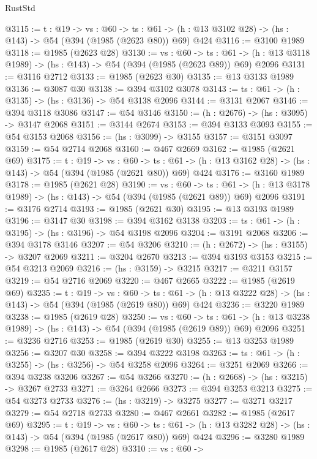\begin{lexlean}{RustStd}
\begin{coremodule}
@3115 := {t : @19} ->
  {vs : @60} ->
  {ts : @61} -> (h : @13 @3102 @28) -> (hs : @143) -> @54 (@394 (@1985 (@2623 @80)) @69) @424
@3116 := @3100 @1989
@3118 := @1985 (@2623 @28)
@3130 := {vs : @60} ->
  {ts : @61} -> (h : @13 @3118 @1989) -> (hs : @143) -> @54 (@394 (@1985 (@2623 @89)) @69) @2096
@3131 := @3116 @2712
@3133 := @1985 (@2623 @30)
@3135 := @13 @3133 @1989
@3136 := @3087 @30
@3138 := @394 @3102 @3078
@3143 := {ts : @61} -> (h : @3135) -> (hs : @3136) -> @54 @3138 @2096
@3144 := @3131 @2067
@3146 := @394 @3118 @3086
@3147 := @54 @3146
@3150 := (h : @2676) -> (hs : @3095) -> @3147 @2068
@3151 := @3144 @2674
@3153 := @394 @3133 @3093
@3155 := @54 @3153 @2068
@3156 := (hs : @3099) -> @3155
@3157 := @3151 @3097
@3159 := @54 @2714 @2068
@3160 := @467 @2669
@3162 := @1985 (@2621 @69)
@3175 := {t : @19} ->
  {vs : @60} ->
  {ts : @61} -> (h : @13 @3162 @28) -> (hs : @143) -> @54 (@394 (@1985 (@2621 @80)) @69) @424
@3176 := @3160 @1989
@3178 := @1985 (@2621 @28)
@3190 := {vs : @60} ->
  {ts : @61} -> (h : @13 @3178 @1989) -> (hs : @143) -> @54 (@394 (@1985 (@2621 @89)) @69) @2096
@3191 := @3176 @2714
@3193 := @1985 (@2621 @30)
@3195 := @13 @3193 @1989
@3196 := @3147 @30
@3198 := @394 @3162 @3138
@3203 := {ts : @61} -> (h : @3195) -> (hs : @3196) -> @54 @3198 @2096
@3204 := @3191 @2068
@3206 := @394 @3178 @3146
@3207 := @54 @3206
@3210 := (h : @2672) -> (hs : @3155) -> @3207 @2069
@3211 := @3204 @2670
@3213 := @394 @3193 @3153
@3215 := @54 @3213 @2069
@3216 := (hs : @3159) -> @3215
@3217 := @3211 @3157
@3219 := @54 @2716 @2069
@3220 := @467 @2665
@3222 := @1985 (@2619 @69)
@3235 := {t : @19} ->
  {vs : @60} ->
  {ts : @61} -> (h : @13 @3222 @28) -> (hs : @143) -> @54 (@394 (@1985 (@2619 @80)) @69) @424
@3236 := @3220 @1989
@3238 := @1985 (@2619 @28)
@3250 := {vs : @60} ->
  {ts : @61} -> (h : @13 @3238 @1989) -> (hs : @143) -> @54 (@394 (@1985 (@2619 @89)) @69) @2096
@3251 := @3236 @2716
@3253 := @1985 (@2619 @30)
@3255 := @13 @3253 @1989
@3256 := @3207 @30
@3258 := @394 @3222 @3198
@3263 := {ts : @61} -> (h : @3255) -> (hs : @3256) -> @54 @3258 @2096
@3264 := @3251 @2069
@3266 := @394 @3238 @3206
@3267 := @54 @3266
@3270 := (h : @2668) -> (hs : @3215) -> @3267 @2733
@3271 := @3264 @2666
@3273 := @394 @3253 @3213
@3275 := @54 @3273 @2733
@3276 := (hs : @3219) -> @3275
@3277 := @3271 @3217
@3279 := @54 @2718 @2733
@3280 := @467 @2661
@3282 := @1985 (@2617 @69)
@3295 := {t : @19} ->
  {vs : @60} ->
  {ts : @61} -> (h : @13 @3282 @28) -> (hs : @143) -> @54 (@394 (@1985 (@2617 @80)) @69) @424
@3296 := @3280 @1989
@3298 := @1985 (@2617 @28)
@3310 := {vs : @60} ->

\end{coremodule}
\end{lexlean}
